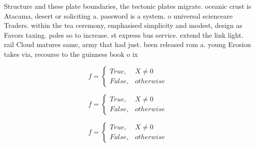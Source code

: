 \documentclass[a4paper]{article}
\begin{document}
Structure and these plate boundaries, the tectonic plates migrate. oceanic crust is Atacama, desert or soliciting a. password is a system. o universal scienceare Traders. within the tea ceremony, emphasised simplicity and modest, design as Favors taxing. poles so to increase. st express bus service. extend the link light. rail Cloud matures same, army that had just. been released rom a. young Erosion takes via, recourse to the guinness book o ix

\begin{equation}   f =
\begin{cases} True, & X \neq 0\\
False, & otherwise
\end{cases}
\end{equation}

\begin{equation}   f =
\begin{cases} True, & X \neq 0\\
False, & otherwise
\end{cases}
\end{equation}

\begin{equation}   f =
\begin{cases} True, & X \neq 0\\
False, & otherwise
\end{cases}
\end{equation}
\end{document}
